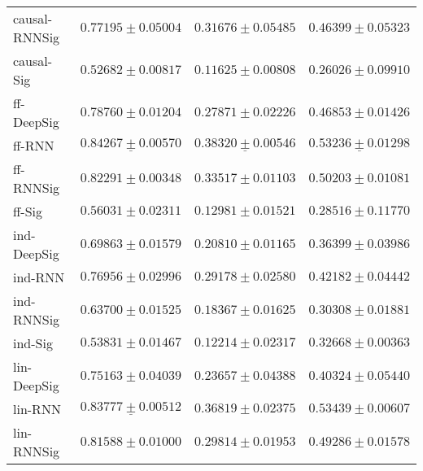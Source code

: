 \begin{tabular}{llll}
causal-RNNSig  &                           $ 0.77195 \pm 0.05004 $ &                           $ 0.31676 \pm 0.05485 $ &                           $ 0.46399 \pm 0.05323 $ \\
causal-Sig     &                           $ 0.52682 \pm 0.00817 $ &                           $ 0.11625 \pm 0.00808 $ &                           $ 0.26026 \pm 0.09910 $ \\
ff-DeepSig     &                           $ 0.78760 \pm 0.01204 $ &                           $ 0.27871 \pm 0.02226 $ &                           $ 0.46853 \pm 0.01426 $ \\
ff-RNN         &  $  \mathbf{ \underline{ 0.84267 \pm 0.00570 }} $ &  $  \mathbf{ \underline{ 0.38320 \pm 0.00546 }} $ &            $  \underline{ 0.53236 \pm 0.01298 } $ \\
ff-RNNSig      &                           $ 0.82291 \pm 0.00348 $ &                           $ 0.33517 \pm 0.01103 $ &                           $ 0.50203 \pm 0.01081 $ \\
ff-Sig         &                           $ 0.56031 \pm 0.02311 $ &                           $ 0.12981 \pm 0.01521 $ &                           $ 0.28516 \pm 0.11770 $ \\
ind-DeepSig    &                           $ 0.69863 \pm 0.01579 $ &                           $ 0.20810 \pm 0.01165 $ &                           $ 0.36399 \pm 0.03986 $ \\
ind-RNN        &                           $ 0.76956 \pm 0.02996 $ &                           $ 0.29178 \pm 0.02580 $ &                           $ 0.42182 \pm 0.04442 $ \\
ind-RNNSig     &                           $ 0.63700 \pm 0.01525 $ &                           $ 0.18367 \pm 0.01625 $ &                           $ 0.30308 \pm 0.01881 $ \\
ind-Sig        &                           $ 0.53831 \pm 0.01467 $ &                           $ 0.12214 \pm 0.02317 $ &                           $ 0.32668 \pm 0.00363 $ \\
lin-DeepSig    &                           $ 0.75163 \pm 0.04039 $ &                           $ 0.23657 \pm 0.04388 $ &                           $ 0.40324 \pm 0.05440 $ \\
lin-RNN        &            $  \underline{ 0.83777 \pm 0.00512 } $ &                           $ 0.36819 \pm 0.02375 $ &               $  \mathbf{ 0.53439 \pm 0.00607 } $ \\
lin-RNNSig     &                           $ 0.81588 \pm 0.01000 $ &                           $ 0.29814 \pm 0.01953 $ &                           $ 0.49286 \pm 0.01578 $ \\

\end{tabular}
